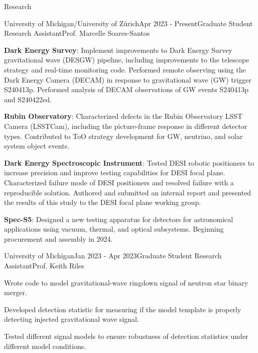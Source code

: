 \documentclass{resume} %
\begin{document}
\begin{rSection}{Research}

\begin{rSubsection}{University of Michigan/University of Zürich}{Apr 2023 - Present}{Graduate Student Research Assistant}{Prof. Marcelle Soares-Santos}
    \item \textbf{Dark Energy Survey}: Implement improvements to Dark Energy Survey gravitational wave (DESGW) pipeline, including improvements to the telescope strategy and real-time monitoring code. Performed remote observing using the Dark Energy Camera (DECAM) in response to gravitational wave (GW) trigger S240413p. Performed analysis of DECAM observations of GW events S240413p and S240422ed.
    \item \textbf{Rubin Observatory}: Characterized defects in the Rubin Observatory LSST Camera (LSSTCam), including the picture-frame response in different detector types. Contributed to ToO strategy development for GW, neutrino, and solar system object events. %
    \item \textbf{Dark Energy Spectroscopic Instrument}: Tested DESI robotic positioners to increase precision and improve testing capabilities for DESI focal plane. Characterized failure mode of DESI positioners and resolved failure with a reproducible solution. Authored and submitted an internal report and presented the results of this study to the DESI focal plane working group.
    \item \textbf{Spec-S5}: Designed a new testing apparatus for detectors for astronomical applications using vacuum, thermal, and optical subsystems. Beginning procurement and assembly in 2024. 
\end{rSubsection}

\begin{rSubsection}{University of Michigan}{Jan 2023 - Apr 2023}{Graduate Student Research Assistant}{Prof. Keith Riles}
    \item Wrote code to model gravitational-wave ringdown signal of neutron star binary merger.
    \item Developed detection statistic for measuring if the model template is properly detecting injected gravitational wave signal. 
    \item Tested different signal models to ensure robustness of detection statistics under different model conditions.
\end{rSubsection}


\end{rSection}
\end{document}
